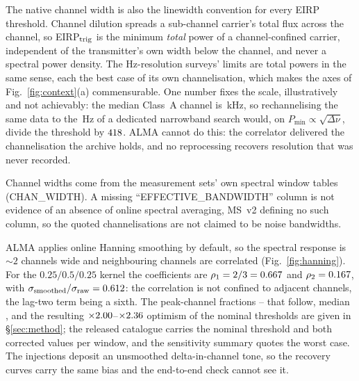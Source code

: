 The native channel width is also the linewidth convention for every EIRP
threshold. Channel dilution spreads a sub-channel carrier's total flux
across the channel, so EIRP$_{\rm trig}$ is the minimum \emph{total} power
of a channel-confined carrier, independent of the transmitter's own width
below the channel, and never a spectral power density. The Hz-resolution
surveys' limits are total powers in the same sense, each the best case of
its own channelisation, which makes the axes of Fig.~\ref{fig:context}(a)
commensurable. One number fixes the scale, illustratively and not
achievably: the median Class~A channel is \SqrtScaleChanKHz\,kHz, so
rechannelising the same data to the \SETIChanHz\,Hz of a dedicated
narrowband search would, on $P_{\min}\propto\sqrt{\Delta\nu}$, divide the
threshold by $418$. ALMA cannot do this: the correlator delivered the
channelisation the archive holds, and no reprocessing recovers resolution
that was never recorded.

Channel widths come from the measurement sets' own spectral window tables
(CHAN\_WIDTH). A missing ``EFFECTIVE\_BANDWIDTH'' column is not evidence of
an absence of online spectral averaging, MS~v2 defining no such column, so
the quoted channelisations are not claimed to be noise bandwidths.

ALMA applies online Hanning smoothing by default, so the spectral response
is ${\sim}2$ channels wide and neighbouring channels are correlated
(Fig.~\ref{fig:hanning}). For the $0.25/0.5/0.25$ kernel the coefficients
are $\rho_1=2/3=0.667$ and $\rho_2=0.167$, with
$\sigma_{\rm smoothed}/\sigma_{\rm raw}=0.612$: the correlation is
not confined to adjacent channels, the lag-two term being a sixth. The
peak-channel fractions \HanWorst--\HanBest{} that follow, median \HanMed,
and the resulting $\times2.00$--$\times2.36$ optimism of the
nominal thresholds are given in \S\ref{sec:method}; the released catalogue
carries the nominal threshold and both corrected values per window, and the
sensitivity summary quotes the worst case. The injections deposit an
unsmoothed delta-in-channel tone, so the recovery curves carry the same bias
and the end-to-end check cannot see it.

